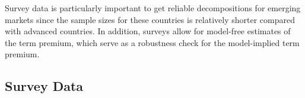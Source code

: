 {Survey data is particularly important to get reliable decompositions for emerging markets %
since the sample sizes for these countries is relatively shorter compared with %
advanced countries.
In addition,
surveys allow for model-free estimates of the term premium, which
serve as a robustness check for the model-implied term premium.


\subsection{Survey Data} \label{sec:SurveyData}
\iftoggle{toclinks}{\gototoc}{} %

}
